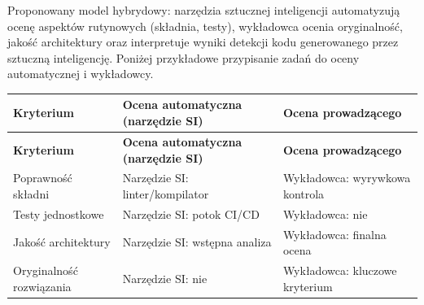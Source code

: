 \documentclass[12pt,a4paper]{article}
\newcommand{\thdrule}{\noalign{\global\setlength{\extrarowheight}{0pt}}}
\newcommand{\thdend}{\noalign{\global\setlength{\extrarowheight}{4pt}}}
\begin{document}
\noindent Proponowany model hybrydowy: narzędzia sztucznej inteligencji automatyzują ocenę aspektów rutynowych (składnia, testy), wykładowca ocenia oryginalność, jakość architektury oraz interpretuje wyniki detekcji kodu generowanego przez sztuczną inteligencję. Poniżej przykładowe przypisanie zadań do oceny automatycznej i wykładowcy.
\medskip
{\scriptsize
\begin{longtable}{m{4.5cm}m{5.5cm}m{4.5cm}}
\thdrule\toprule
\rowcolor{pjatkRed}
{\color{white}\footnotesize\textbf{\vphantom{Ag}Kryterium}} & {\color{white}\footnotesize\textbf{\vphantom{Ag}Ocena automatyczna (narzędzie SI)}} & {\color{white}\footnotesize\textbf{\vphantom{Ag}Ocena prowadzącego}} \\
\midrule\thdend
\endfirsthead
\thdrule\toprule
\rowcolor{pjatkRed}
{\color{white}\footnotesize\textbf{\vphantom{Ag}Kryterium}} & {\color{white}\footnotesize\textbf{\vphantom{Ag}Ocena automatyczna (narzędzie SI)}} & {\color{white}\footnotesize\textbf{\vphantom{Ag}Ocena prowadzącego}} \\
\midrule\thdend
\endhead
\rowcolor{tableRowLight} Poprawność składni & Narzędzie SI: linter/kompilator & Wykładowca: wyrywkowa kontrola \\
\rowcolor{tableRowAlt} Testy jednostkowe & Narzędzie SI: potok CI/CD & Wykładowca: nie \\
\rowcolor{tableRowLight} Jakość architektury & Narzędzie SI: wstępna analiza & Wykładowca: finalna ocena \\
\rowcolor{tableRowAlt} Oryginalność rozwiązania & Narzędzie SI: nie & Wykładowca: kluczowe kryterium \\
\bottomrule
\end{longtable}}
\medskip
\end{document}
